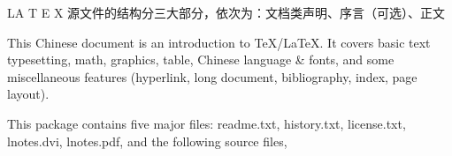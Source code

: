LA T E X 源文件的结构分三大部分，依次为：文档类声明、序言（可选）、正文

This Chinese document is an introduction to TeX/LaTeX. It covers basic text 
typesetting, math, graphics, table, Chinese language & fonts, and some 
miscellaneous features (hyperlink, long document, bibliography, index, page 
layout).

This package contains five major files: readme.txt, history.txt, license.txt, 
lnotes.dvi, lnotes.pdf, and the following source files,
